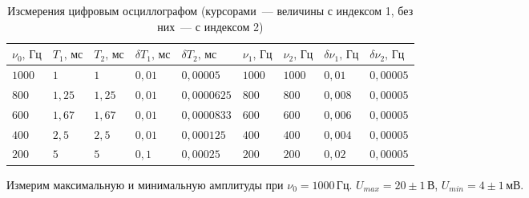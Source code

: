 \begin{table}[ht!]
    \caption{Изсмерения цифровым осциллографом (курсорами~--- величины с индексом 1, 
    без них~--- с индексом 2)}
    \begin{tabular}{|l|l|l|l|l|l|l|l|l|}
    \hline
    $\nu_0,\,\text{Гц}$ & $T_1,\,\text{мс}$ & $T_2,\,\text{мс}$ & $\delta T_1,\,\text{мс}$ & $\delta T_2,\,\text{мс}$ & $\nu_1,\,\text{Гц}$ & $\nu_2,\,\text{Гц}$ & $\delta\nu_1,\,\text{Гц}$ & $\delta\nu_2,\,\text{Гц}$ \\ \hline
    $1000$              & $1$               & $1$               & $0{,}01$                 & $0{,}00005$              & $1000$              & $1000$              & $0{,}01$                  & $0{,}00005$               \\ \hline
    $800$               & $1{,}25$          & $1{,}25$          & $0{,}01$                 & $0{,}0000625$            & $800$               & $800$               & $0{,}008$                 & $0{,}00005$               \\ \hline
    $600$               & $1{,}67$          & $1{,}67$          & $0{,}01$                 & $0{,}0000833$            & $600$               & $600$               & $0{,}006$                 & $0{,}00005$               \\ \hline
    $400$               & $2{,}5$           & $2{,}5$           & $0{,}01$                 & $0{,}000125$             & $400$               & $400$               & $0{,}004$                 & $0{,}00005$               \\ \hline
    $200$               & $5$               & $5$               & $0{,}1$                  & $0{,}00025$              & $200$               & $200$               & $0{,}02$                  & $0{,}00005$               \\ \hline
    \end{tabular}
\end{table}

Измерим максимальную и минимальную амплитуды при $\nu_0=1000\,\text{Гц}$.
$U_{max}=20\pm 1\,\text{В}$, $U_{min}=4\pm 1\,\text{мВ}$.

